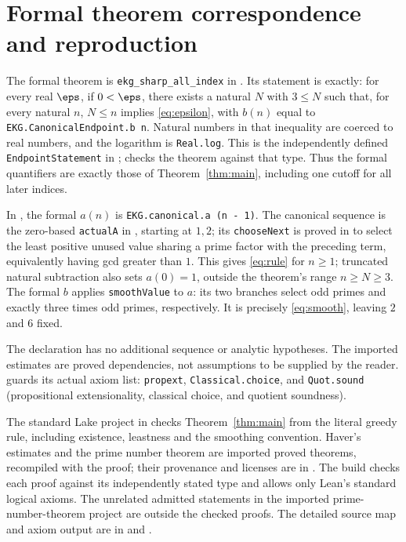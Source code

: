 \section{Formal theorem correspondence and reproduction}
The formal theorem is \texttt{ekg\_sharp\_all\_index} in
. Its statement is exactly: for every
real $\eps$, if $0<\eps$, there exists a natural $N$ with $3\leq N$
such that, for every natural $n$, $N\leq n$ implies
\eqref{eq:epsilon}, with $b(n)$ equal to
\texttt{EKG.CanonicalEndpoint.b n}. Natural numbers in that inequality
are coerced to real numbers, and the logarithm is \texttt{Real.log}.
This is the independently defined \texttt{EndpointStatement} in
;  checks the theorem
against that type. Thus the formal quantifiers are exactly those of
Theorem~\ref{thm:main}, including one cutoff for all later indices.

In , the formal $a(n)$ is
\texttt{EKG.canonical.a (n - 1)}. The canonical sequence is the
zero-based \texttt{actualA} in , starting
at $1,2$; its \texttt{chooseNext} is proved in 
to select the least positive unused value sharing a prime factor with
the preceding term, equivalently having gcd greater than $1$.
This gives \eqref{eq:rule} for $n\geq1$; truncated natural subtraction
also sets $a(0)=1$, outside the theorem's range $n\geq N\geq3$.
The formal $b$ applies \texttt{smoothValue} to $a$: its two branches
select odd primes and exactly three times odd primes, respectively.
It is precisely \eqref{eq:smooth}, leaving $2$ and $6$ fixed.

The declaration has no additional sequence or analytic hypotheses.
The imported estimates are proved dependencies, not assumptions to be
supplied by the reader.  guards its actual axiom
list: \texttt{propext}, \texttt{Classical.choice}, and
\texttt{Quot.sound} (propositional extensionality, classical choice,
and quotient soundness).

The standard Lake project in  checks Theorem~\ref{thm:main}
from the literal greedy rule, including existence, leastness and the
smoothing convention. Haver's estimates and the prime number theorem
are imported proved theorems, recompiled with the proof; their provenance
and licenses are in . The build checks each proof against its independently stated type and
allows only Lean's standard logical axioms. The unrelated admitted
statements in the imported prime-number-theorem project are outside the
checked proofs. The detailed source map and axiom output are in
 and .

